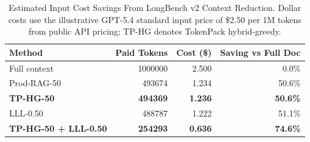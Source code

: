 \begin{table}[!t]
\caption{Estimated Input Cost Savings From LongBench v2 Context Reduction. Dollar costs use the illustrative GPT-5.4 standard input price of \$2.50 per 1M tokens from public API pricing; TP-HG denotes TokenPack hybrid-greedy.}
\label{tab:cost-savings}
\centering
\scriptsize
\begin{tabular}{@{}lrrr@{}}
\toprule
\rowcolor{tablehead}
Method & Paid Tokens & Cost (\$) & Saving vs Full Doc \\
\midrule
Full context & 1000000 & 2.500 & 0.0\% \\
Prod-RAG-50 & 493674 & 1.234 & 50.6\% \\
\rowcolor{tokenpackhighlight}\textbf{TP-HG-50} & \textbf{494369} & \textbf{1.236} & \textbf{50.6\%} \\
LLL-0.50 & 488787 & 1.222 & 51.1\% \\
\rowcolor{tokenpackhighlight}\textbf{TP-HG-50 + LLL-0.50} & \textbf{254293} & \textbf{0.636} & \textbf{74.6\%} \\
\bottomrule
\end{tabular}
\end{table}
